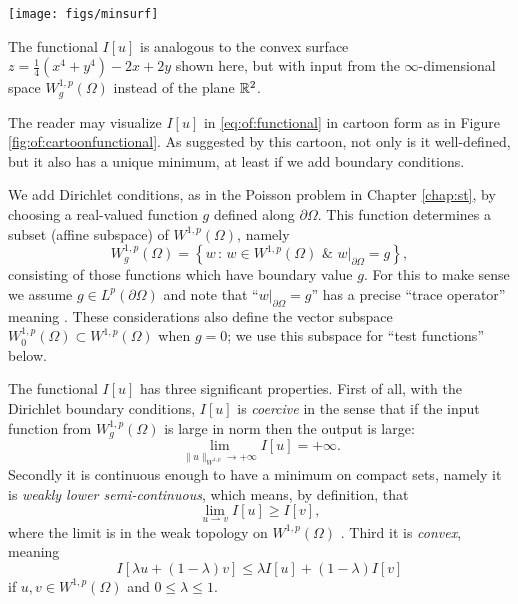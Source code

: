 \begin{marginfigure}
\texttt{[image: figs/minsurf]} %
\medskip
\caption{The functional $I[u]$ is analogous to the convex surface $z = \tfrac{1}{4}(x^4 + y^4) - 2x + 2y$ shown here, but with input from the $\infty$-dimensional space $W_g^{1,p}(\Omega)$ instead of the plane $\mathbb{R}^2$.}
\label{fig:of:cartoonfunctional}
\end{marginfigure}

The reader may visualize $I[u]$ in \eqref{eq:of:functional} in cartoon form as in Figure \ref{fig:of:cartoonfunctional}.  As suggested by this cartoon, not only is it well-defined, but it also has a unique minimum, at least if we add boundary conditions.

We add Dirichlet conditions, as in the Poisson problem in Chapter \ref{chap:st}, by choosing a real-valued function $g$ defined along $\partial \Omega$.  This function determines a subset (affine subspace) of $W^{1,p}(\Omega)$, namely
\begin{equation}
    W_g^{1,p}(\Omega) = \left\{w \,:\, w \in W^{1,p}(\Omega) \,\, \& \,\, w\big|_{\partial \Omega} = g\right\},  \label{eq:of:affinedirichlet}
\end{equation}
consisting of those functions which have boundary value $g$.  For this to make sense we assume $g \in L^p(\partial \Omega)$ and note that ``$w\big|_{\partial \Omega} = g$'' has a precise ``trace operator'' meaning \citep{Evans2010}.  These considerations also define the vector subspace $W_0^{1,p}(\Omega) \subset W^{1,p}(\Omega)$ when $g=0$; we use this subspace for ``test functions'' below.

The functional $I[u]$ has three significant properties.  First of all, with the Dirichlet boundary conditions, $I[u]$ is \emph{coercive} in the sense that if the input function from $W_g^{1,p}(\Omega)$ is large in norm then the output is large:
\begin{equation}
\lim_{\|u\|_{W^{1,p}} \to +\infty} I[u] = +\infty.   \label{eq:of:coercivity}
\end{equation}
Secondly it is continuous enough to have a minimum on compact sets, namely it is \emph{weakly lower semi-continuous}, which means, by definition, that
\begin{equation}
\lim_{u\rightharpoonup v} I[u] \ge I[v],  \label{eq:of:lowersemicont}
\end{equation}
where the limit is in the weak topology on $W^{1,p}(\Omega)$ \citep{Evans2010,KinderlehrerStampacchia1980}.  Third it is \emph{convex}, meaning
\begin{equation}
I[\lambda u + (1-\lambda) v] \le \lambda I[u] + (1-\lambda) I[v]    \label{eq:of:convexity}
\end{equation}
if $u,v\in W^{1,p}(\Omega)$ and $0 \le \lambda \le 1$.

